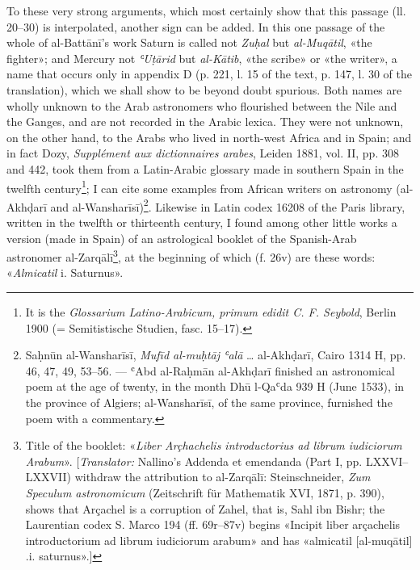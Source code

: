 \documentclass[11pt]{article}
\begin{document}
\par To these very strong arguments, which most certainly show that this passage (ll. 20–30) is interpolated, another sign can be added. In this one passage of the whole of al-Battānī's work Saturn is called not \emph{Zuḥal} but \emph{al-Muqātil}, «the fighter»; and Mercury not \emph{ʿUṭārid} but \emph{al-Kātib}, «the scribe» or «the writer», a name that occurs only in appendix D (p. 221, l. 15 of the text, p. 147, l. 30 of the translation), which we shall show to be beyond doubt spurious. Both names are wholly unknown to the Arab astronomers who flourished between the Nile and the Ganges, and are not recorded in the Arabic lexica. They were not unknown, on the other hand, to the Arabs who lived in north-west Africa and in Spain; and in fact Dozy, \emph{Supplément aux dictionnaires arabes}, Leiden 1881, vol. II, pp. 308 and 442, took them from a Latin-Arabic glossary made in southern Spain in the twelfth century\footnote{It is the \emph{Glossarium Latino-Arabicum, primum edidit C. F. Seybold}, Berlin 1900 (= Semitistische Studien, fasc. 15–17).}; I can cite some examples from African writers on astronomy (al-Akhḍarī and al-Wansharīsī)\footnote{Saḥnūn al-Wansharīsī, \emph{Mufīd al-muḥtāj ʿalā} … al-Akhḍarī, Cairo 1314 H, pp. 46, 47, 49, 53–56. — ʿAbd al-Raḥmān al-Akhḍarī finished an astronomical poem at the age of twenty, in the month Dhū l-Qaʿda 939 H (June 1533), in the province of Algiers; al-Wansharīsī, of the same province, furnished the poem with a commentary.}. Likewise in Latin codex 16208 of the Paris library, written in the twelfth or thirteenth century, I found among other little works a version (made in Spain) of an astrological booklet of the Spanish-Arab astronomer al-Zarqālī\footnote{Title of the booklet: «\emph{Liber Arçhachelis introductorius ad librum iudiciorum Arabum}». [\emph{Translator:} Nallino's Addenda et emendanda (Part I, pp. LXXVI–LXXVII) withdraw the attribution to al-Zarqālī: Steinschneider, \emph{Zum Speculum astronomicum} (Zeitschrift für Mathematik XVI, 1871, p. 390), shows that Arçachel is a corruption of Zahel, that is, Sahl ibn Bishr; the Laurentian codex S. Marco 194 (ff. 69r–87v) begins «Incipit liber arçachelis introductorium ad librum iudiciorum arabum» and has «almicatil [al-muqātil] .i. saturnus».]}, at the beginning of which (f. 26v) are these words: «\emph{Almicatil} i. Saturnus».\par
\end{document}
